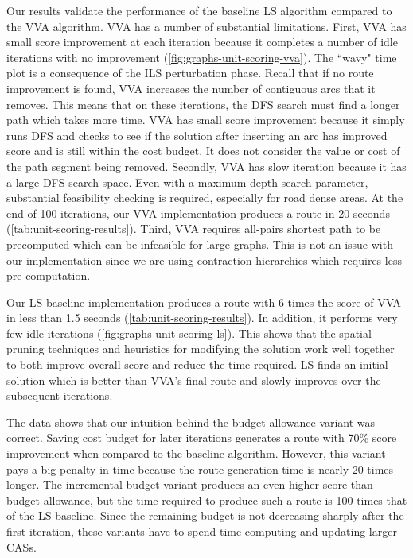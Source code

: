 \documentclass[honors]{union-cs-thesis}
\begin{document}
Our results validate the performance of the baseline LS algorithm compared to the VVA algorithm. VVA has a number of substantial limitations. First, VVA has small score improvement at each iteration because it completes a number of idle iterations with no improvement (\cref{fig:graphs-unit-scoring-vva}). The ``wavy" time plot is a consequence of the ILS perturbation phase. Recall that if no route improvement is found, VVA increases the number of contiguous arcs that it removes. This means that on these iterations, the DFS search must find a longer path which takes more time. VVA has small score improvement because it simply runs DFS and checks to see if the solution after inserting an arc has improved score and is still within the cost budget. It does not consider the value or cost of the path segment being removed. Secondly, VVA has slow iteration because it has a large DFS search space. Even with a maximum depth search parameter, substantial feasibility checking is required, especially for road dense areas. At the end of 100 iterations, our VVA implementation produces a route in 20 seconds (\cref{tab:unit-scoring-results}). Third, VVA requires all-pairs shortest path to be precomputed which can be infeasible for large graphs. This is not an issue with our implementation since we are using contraction hierarchies which requires less pre-computation. 

Our LS baseline implementation produces a route with 6 times the score of VVA in less than 1.5 seconds (\cref{tab:unit-scoring-results}). In addition, it performs very few idle iterations (\cref{fig:graphs-unit-scoring-ls}). This shows that the spatial pruning techniques and heuristics for modifying the solution work well together to both improve overall score and reduce the time required. LS finds an initial solution which is better than VVA's final route and slowly improves over the subsequent iterations.

The data shows that our intuition behind the budget allowance variant was correct. Saving cost budget for later iterations generates a route with 70\% score improvement when compared to the baseline algorithm. However, this variant pays a big penalty in time because the route generation time is nearly 20 times longer. The incremental budget variant produces an even higher score than budget allowance, but the time required to produce such a route is 100 times that of the LS baseline. Since the remaining budget is not decreasing sharply after the first iteration, these variants have to spend time computing and updating larger CASs.
\end{document}
